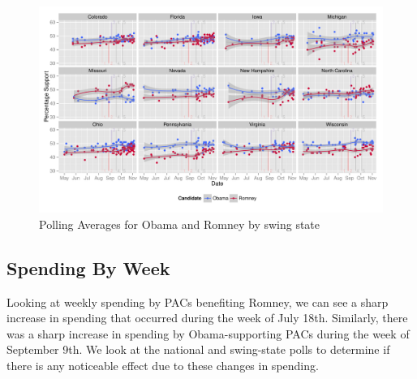 \documentclass[11pt]{article}\usepackage{graphicx, color}
\newenvironment{knitrout}{}{} %
\begin{document}
\begin{knitrout}
\color{fgcolor}\begin{figure}[H]


{\centering \includegraphics[width=\textwidth]{figure/type_swing_1} 

}

\caption[Polling Averages for Obama and Romney by swing state]{Polling Averages for Obama and Romney by swing state\label{fig:type_swing_1}}
\end{figure}

\end{knitrout}



\subsection{Spending By Week}

Looking at weekly spending by PACs benefiting Romney, we can see a sharp increase in spending that occurred during the week of July 18th. Similarly, there was a sharp increase in spending by Obama-supporting PACs during the week of September 9th. We look at the national and swing-state polls to determine if there is any noticeable effect due to these changes in spending.
\end{document}
